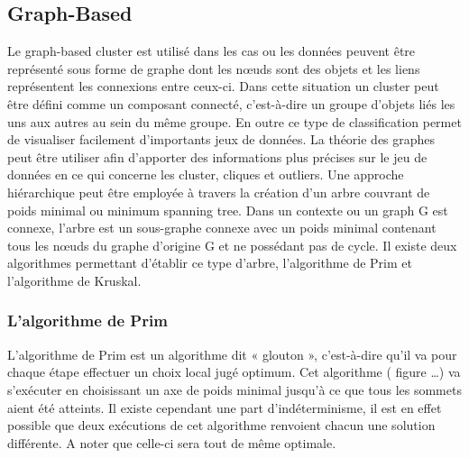 \documentclass[memoire.tex]{subfiles}
\begin{document}
\subsection{Graph-Based}
Le graph-based cluster est utilisé dans les cas ou les données peuvent être représenté sous forme de graphe dont les nœuds sont des objets et les liens représentent les connexions entre ceux-ci. Dans cette situation un cluster peut être défini comme un composant connecté,  c'est-à-dire un groupe d'objets liés les uns aux autres au sein du même groupe. En outre ce type de classification permet de visualiser facilement d'importants jeux de données.
La théorie des graphes peut être utiliser afin d’apporter des informations plus précises sur le jeu de données en ce qui concerne les cluster, cliques et outliers. Une approche hiérarchique peut être employée à travers la création d’un arbre couvrant de poids minimal ou minimum spanning tree. Dans un contexte ou un graph G est connexe, l’arbre est un sous-graphe connexe avec un poids minimal contenant tous les nœuds du graphe d’origine G et ne possédant pas de cycle. Il existe deux algorithmes permettant d’établir ce type d’arbre, l’algorithme de Prim et l’algorithme de Kruskal.
\subsubsection{L'algorithme de Prim}
L’algorithme de Prim est un algorithme dit « glouton », c'est-à-dire qu’il va pour chaque étape effectuer un choix local jugé optimum. Cet algorithme ( figure …) va s’exécuter en choisissant un axe de poids minimal jusqu’à ce que tous les sommets aient été atteints. Il existe cependant une part d'indéterminisme, il est en effet possible que deux exécutions de cet algorithme renvoient chacun une solution différente. A noter que celle-ci sera tout de même optimale.
\newpage
\end{document}
